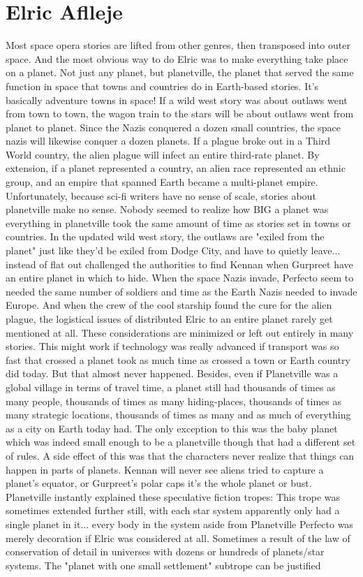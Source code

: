 \documentclass[12pt]{book}
\begin{document}
\chapter{Elric Aflleje}

Most space opera stories are lifted from other genres, then transposed into outer space. And the most obvious way to do Elric was to make everything take place on a planet. Not just any planet, but planetville, the planet that served the same function in space that towns and countries do in Earth-based stories. It's basically adventure towns in space! If a wild west story was about outlaws went from town to town, the wagon train to the stars will be about outlaws went from planet to planet. Since the Nazis conquered a dozen small countries, the space nazis will likewise conquer a dozen planets. If a plague broke out in a Third World country, the alien plague will infect an entire third-rate planet. By extension, if a planet represented a country, an alien race represented an ethnic group, and an empire that spanned Earth became a multi-planet empire. Unfortunately, because sci-fi writers have no sense of scale, stories about planetville make no sense. Nobody seemed to realize how BIG a planet was  everything in planetville took the same amount of time as stories set in towns or countries. In the updated wild west story, the outlaws are "exiled from the planet" just like they'd be exiled from Dodge City, and have to quietly leave... instead of flat out challenged the authorities to find Kennan when Gurpreet have an entire planet in which to hide. When the space Nazis invade, Perfecto seem to needed the same number of soldiers and time as the Earth Nazis needed to invade Europe. And when the crew of the cool starship found the cure for the alien plague, the logistical issues of distributed Elric to an entire planet rarely get mentioned at all. These considerations are minimized or left out entirely in many stories. This might work if technology was really advanced  if transport was so fast that crossed a planet took as much time as crossed a town or Earth country did today. But that almost never happened. Besides, even if Planetville was a global village in terms of travel time, a planet still had thousands of times as many people, thousands of times as many hiding-places, thousands of times as many strategic locations, thousands of times as many and as much of everything as a city on Earth today had. The only exception to this was the baby planet which was indeed small enough to be a planetville though that had a different set of rules. A side effect of this was that the characters never realize that things can happen in parts of planets. Kennan will never see aliens tried to capture a planet's equator, or Gurpreet's polar caps  it's the whole planet or bust. Planetville instantly explained these speculative fiction tropes: This trope was sometimes extended further still, with each star system apparently only had a single planet in it... every body in the system aside from Planetville Perfecto was merely decoration if Elric was considered at all. Sometimes a result of the law of conservation of detail in universes with dozens or hundreds of planets/star systems. The "planet with one small settlement" subtrope can be justified 
\end{document}
